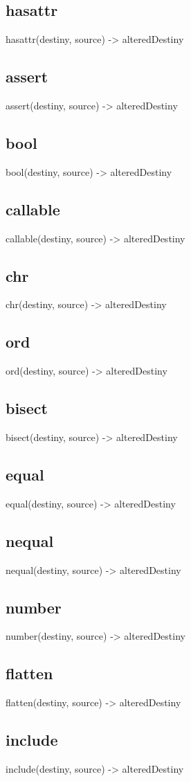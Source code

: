 {{{{{{{{\subsection*{hasattr}
hasattr(destiny, source) -> alteredDestiny
\subsection*{assert}
assert(destiny, source) -> alteredDestiny
\subsection*{bool}
bool(destiny, source) -> alteredDestiny
\subsection*{callable}
callable(destiny, source) -> alteredDestiny
\subsection*{chr}
chr(destiny, source) -> alteredDestiny
\subsection*{ord}
ord(destiny, source) -> alteredDestiny
\subsection*{bisect}
bisect(destiny, source) -> alteredDestiny
\subsection*{equal}
equal(destiny, source) -> alteredDestiny
\subsection*{nequal}
nequal(destiny, source) -> alteredDestiny
\subsection*{number}
number(destiny, source) -> alteredDestiny
\subsection*{flatten}
flatten(destiny, source) -> alteredDestiny
\subsection*{include}
include(destiny, source) -> alteredDestiny
}}}}}}}}
